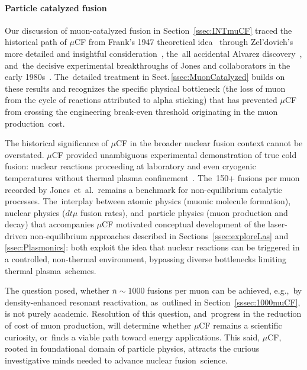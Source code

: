 \documentclass[particles,article,accept,pdftex,moreauthors]{Definitions/mdpi}
\begin{document}
\vspace{-6pt}\paragraph*{\bf Particle catalyzed fusion}
Our discussion of muon-catalyzed fusion in Section~\ref{ssec:INTmuCF} traced the historical path of $\mu$CF from Frank's 1947 theoretical idea~\cite{Frank:1947} through Zel'dovich's more detailed and insightful consideration~\cite{Zel:1954}, the~all accidental Alvarez discovery~\cite{Alvarez:1957un}, and~the decisive experimental breakthroughs of Jones and collaborators in the early 1980s~\cite{Jones:1983pw,Jones:1986kk,Jones:1986Na}. The~detailed treatment in Sect.\,\ref{ssec:MuonCatalyzed} builds on these results and recognizes the specific physical bottleneck (the loss of muon from the cycle of reactions attributed to alpha sticking) that has prevented $\mu$CF from crossing the engineering break-even threshold originating in the muon production~cost.

The historical significance of $\mu$CF in the broader nuclear fusion context cannot be overstated. $\mu$CF provided unambiguous experimental demonstration of true cold fusion: nuclear reactions proceeding at laboratory and even cryogenic temperatures without thermal plasma confinement~\cite{Rafelski:1987Jones}. The~150+ fusions per muon recorded by Jones~et~al.\ remains a benchmark for non-equilibrium catalytic processes. The~interplay between atomic physics (muonic molecule formation), nuclear physics ($dt\mu$ fusion rates), and~particle physics (muon production and decay) that accompanies $\mu$CF motivated conceptual development of the laser-driven non-equilibrium approaches described in Sections~\ref{ssec:exploreLas} and \ref{ssec:Plasmonics}: both exploit the idea that nuclear reactions can be triggered in a controlled, non-thermal environment, bypassing diverse bottlenecks limiting thermal plasma~schemes.

The question posed, whether $\bar{n}\sim 1000$ fusions per muon can be achieved, e.g.,~by density-enhanced resonant reactivation, as~outlined in Section~\ref{sssec:1000muCF}, is not purely academic. Resolution of this question, and~progress in the reduction of cost of muon production, will determine whether $\mu$CF remains a scientific curiosity, or~finds a viable path toward energy applications. This said, $\mu$CF, rooted in foundational domain of particle physics, attracts the curious investigative minds needed to advance nuclear fusion~science.
\end{document}
